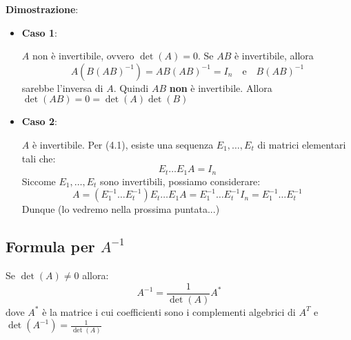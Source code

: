 \documentclass[a4paper]{article}
\theoremstyle{break}
\theoremstyle{break}
\theoremstyle{break}
\theoremstyle{break}
\begin{document}
\vspace{1em}
\noindent \textbf{Dimostrazione}:
\begin{itemize}
  \item \textbf{Caso 1}:

    \( A \) non è invertibile, ovvero \( \det(A) = 0 \). Se \( AB \) è invertibile, allora
    \[
      A(B(AB)^{-1}) = AB(AB)^{-1} = I_n \quad \text{e} \quad B(AB)^{-1}
    \] 
    sarebbe l'inversa di \( A \). Quindi \( AB \) \textbf{non} è invertibile.
    Allora \( \det(AB) = 0 = \det(A) \det(B) \) 

  \item \textbf{Caso 2}:

    \( A \) è invertibile. Per (4.1), esiste una sequenza \( E_1, \ldots, E_t \) di
    matrici elementari tali che:
    \[
    E_t \ldots E_1 A = I_n
    \] 
    Siccome \( E_1, \ldots, E_t \) sono invertibili, possiamo considerare:
    \[
    A = (E_1^{-1} \ldots E_t^{-1})E_t \ldots E_1 A = E_1^{-1} \ldots E_t^{-1}
    I_n = E_1^{-1} \ldots E_t^{-1}
    \] 
    Dunque (lo vedremo nella prossima puntata...)
\end{itemize}

\subsection{Formula per \texorpdfstring{\( A^{-1} \)}{A inversa}}
Se \( \det(A) \neq 0 \) allora:
\[
  A^{-1} = \frac{1}{\det(A)} A^*
\] 
dove \( A^* \) è la matrice i cui coefficienti sono i complementi algebrici di \( A^T \)
e \( \det(A^{-1}) = \frac{1}{\det(A)} \) 
\end{document}
